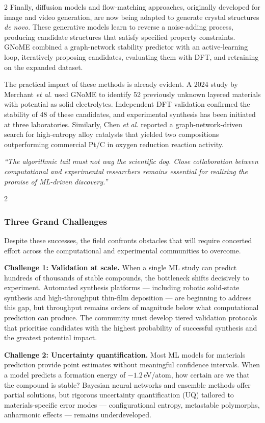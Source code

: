 \documentclass[a4paper,11pt]{article}
\newcommand{\pullquote}[2][2]{%
  \end{multicols}
  \vspace{8pt}
  \begin{tcolorbox}[
    enhanced,
    colback=boxbg,
    colframe=accent,
    arc=0mm,
    boxrule=0pt,
    leftrule=4pt,
    top=10pt,
    bottom=10pt,
    left=14pt,
    right=14pt,
    before skip=0pt,
    after skip=0pt,
  ]
  {\large\itshape\color{accent}``#2''}
  \end{tcolorbox}
  \vspace{8pt}
  \begin{multicols}{#1}
  \noindent\ignorespaces
}
\begin{document}
\begin{multicols}{2}
\medskip
Finally, diffusion models and flow-matching approaches, originally developed
for image and video generation, are now being adapted to generate crystal
structures \textit{de novo}. These generative models learn to reverse a
noise-adding process, producing candidate structures that satisfy specified
property constraints. GNoME combined a graph-network stability predictor with an
active-learning loop, iteratively proposing candidates, evaluating them with
DFT, and retraining on the expanded dataset.

\medskip
The practical impact of these methods is already evident. A 2024 study by
Merchant \textit{et al.} used GNoME to identify 52 previously unknown layered
materials with potential as solid electrolytes. Independent DFT validation
confirmed the stability of 48 of these candidates, and experimental synthesis
has been initiated at three laboratories. Similarly, Chen \textit{et al.}
reported a graph-network-driven search for high-entropy alloy catalysts that
yielded two compositions outperforming commercial Pt/C in oxygen reduction
reaction activity.

\pullquote{The algorithmic tail must not wag the scientific dog. Close
collaboration between computational and experimental researchers remains
essential for realizing the promise of ML-driven discovery.}

\subsubsection{Three Grand Challenges}

Despite these successes, the field confronts obstacles that will require
concerted effort across the computational and experimental communities to
overcome.

\textbf{Challenge 1: Validation at scale.} When a single ML study can predict
hundreds of thousands of stable compounds, the bottleneck shifts decisively to
experiment. Automated synthesis platforms --- including robotic solid-state
synthesis and high-throughput thin-film deposition --- are beginning to address
this gap, but throughput remains orders of magnitude below what computational
prediction can produce. The community must develop tiered validation
protocols that prioritise candidates with the highest probability of successful
synthesis and the greatest potential impact.

\textbf{Challenge 2: Uncertainty quantification.} Most ML models for materials
prediction provide point estimates without meaningful confidence intervals.
When a model predicts a formation energy of $-1.2$\,eV/atom, how certain are we
that the compound is stable? Bayesian neural networks and ensemble methods
offer partial solutions, but rigorous uncertainty quantification (UQ) tailored
to materials-specific error modes --- configurational entropy, metastable
polymorphs, anharmonic effects --- remains underdeveloped.


\end{multicols}
\end{document}
